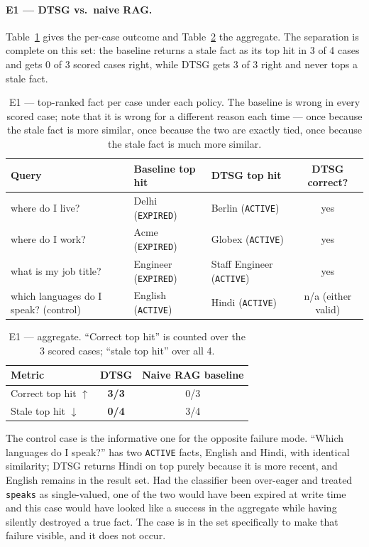 \documentclass[11pt,a4paper]{article}
\begin{document}
\paragraph{E1 --- DTSG vs.\ naive RAG.} Table~\ref{tab:e1} gives the per-case
outcome and Table~\ref{tab:e1sum} the aggregate. The separation is complete on
this set: the baseline returns a stale fact as its top hit in 3 of 4 cases and
gets 0 of 3 scored cases right, while DTSG gets 3 of 3 right and never tops a
stale fact.

\begin{table}[htbp]
\centering
\caption{E1 --- top-ranked fact per case under each policy. The baseline is
wrong in every scored case; note that it is wrong for a different reason each
time --- once because the stale fact is more similar, once because the two are
exactly tied, once because the stale fact is much more similar.}
\label{tab:e1}
\small
\begin{tabularx}{\textwidth}{X l l c}
\toprule
\textbf{Query} & \textbf{Baseline top hit} & \textbf{DTSG top hit} & \textbf{DTSG correct?}\\
\midrule
where do I live? & Delhi (\texttt{EXPIRED}) & Berlin (\texttt{ACTIVE}) & yes\\
where do I work? & Acme (\texttt{EXPIRED}) & Globex (\texttt{ACTIVE}) & yes\\
what is my job title? & Engineer (\texttt{EXPIRED}) & Staff Engineer (\texttt{ACTIVE}) & yes\\
which languages do I speak? (control) & English (\texttt{ACTIVE}) & Hindi (\texttt{ACTIVE}) & n/a (either valid)\\
\bottomrule
\end{tabularx}
\end{table}

\begin{table}[htbp]
\centering
\caption{E1 --- aggregate. ``Correct top hit'' is counted over the 3 scored
cases; ``stale top hit'' over all 4.}
\label{tab:e1sum}
\begin{tabular}{lcc}
\toprule
\textbf{Metric} & \textbf{DTSG} & \textbf{Naive RAG baseline}\\
\midrule
Correct top hit $\uparrow$ & \textbf{3/3} & 0/3\\
Stale top hit $\downarrow$ & \textbf{0/4} & 3/4\\
\bottomrule
\end{tabular}
\end{table}

The control case is the informative one for the opposite failure mode. ``Which
languages do I speak?'' has two \texttt{ACTIVE} facts, English and Hindi, with
identical similarity; DTSG returns Hindi on top purely because it is more
recent, and English remains in the result set. Had the classifier been
over-eager and treated \texttt{speaks} as single-valued, one of the two would
have been expired at write time and this case would have looked like a success
in the aggregate while having silently destroyed a true fact. The case is in the
set specifically to make that failure visible, and it does not occur.
\end{document}
